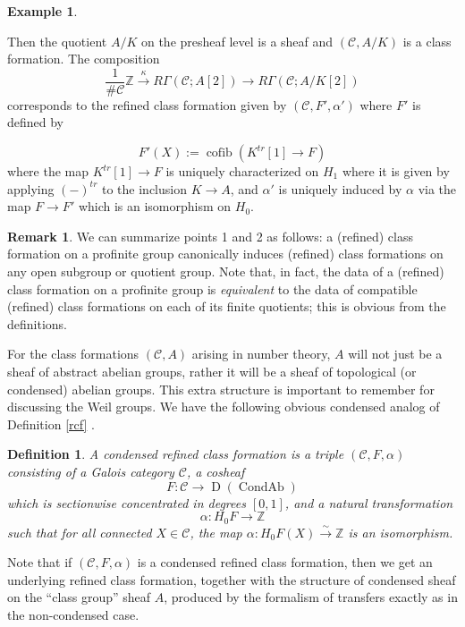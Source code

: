 \documentclass[12pt]{article}
\newtheorem{definition}[theorem]{Definition}
\theoremstyle{definition}
\newtheorem{example}[theorem]{Example}
\newtheorem{remark}[theorem]{Remark}
\newcommand{\on}{\operatorname}
\newcommand{\mc}{\mathcal}
\newcommand{\mbb}{\mathbb}
\begin{document}
\begin{example}
\begin{enumerate}
Then the quotient $A/K$ on the presheaf level is a sheaf and $(\mc{C},A/K)$ is a class formation.  The composition
$$\frac{1}{\#\mc{C}}\mbb{Z} \overset{\kappa}{\rightarrow} R\Gamma(\mc{C};A[2]) \to R\Gamma(\mc{C};A/K[2])$$
corresponds to the refined class formation given by $(\mc{C},F',\alpha')$ where $F'$ is defined by

$$F'(X) := \on{cofib}(K^{tr}[1]\to F)$$
where the map $K^{tr}[1] \to F$ is uniquely characterized on $H_1$ where it is given by applying $(-)^{tr}$ to the inclusion $K\to A$, and $\alpha'$ is uniquely induced by $\alpha$ via the map $F\to F'$ which is an isomorphism on $H_0$.  
\end{enumerate} 
\end{example}


\begin{remark}
We can summarize points 1 and 2 as follows: a (refined) class formation on a profinite group canonically induces (refined) class formations on any open subgroup or quotient group.  Note that, in fact, the data of a (refined) class formation on a profinite group is \emph{equivalent} to the data of compatible (refined) class formations on each of its finite quotients; this is obvious from the definitions.
\end{remark}

For the class formations $(\mc{C},A)$ arising in number theory, $A$ will not just be a sheaf of abstract abelian groups, rather it will be a sheaf of topological (or condensed) abelian groups.  This extra structure is important to remember for discussing the Weil groups.  We have the following obvious condensed analog of Definition \ref{rcf}  .

\begin{definition}\label{crcf}
A \emph{condensed refined class formation} is a triple $(\mc{C},F,\alpha)$ consisting of a Galois category $\mc{C}$, a cosheaf
$$F:\mc{C} \to \on{D}(\on{CondAb})$$
which is sectionwise concentrated in degrees $[0,1]$, and a natural transformation
$$\alpha:H_0F\to \mbb{Z}$$
such that for all connected $X\in\mc{C}$, the map $\alpha:H_0F(X)\overset{\sim}{\rightarrow}\mbb{Z}$ is an isomorphism.
\end{definition}

Note that if $(\mc{C},F,\alpha)$ is a condensed refined class formation, then we get an underlying refined class formation, together with the structure of condensed sheaf on the ``class group'' sheaf $A$, produced by the formalism of transfers exactly as in the non-condensed case.
\end{document}
